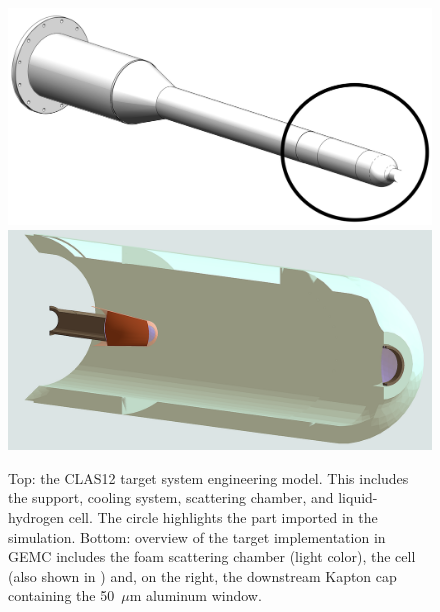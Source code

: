 \begin{figure}[ht]
	\centering
	\includegraphics[width=0.99\columnwidth,keepaspectratio]{img/targetOverview2.png}
	\includegraphics[width=0.99\columnwidth,keepaspectratio]{img/targetOverview1.png}
	\caption{Top: the CLAS12 target system engineering model. This includes the support, cooling system, scattering
          chamber, and liquid-hydrogen cell. The circle highlights the part imported in the simulation. Bottom: overview of
          the target implementation in GEMC includes the foam scattering chamber (light color), the cell (also shown in
          ) and, on the right, the downstream Kapton cap containing the 50~$\mu$m aluminum window.}
	\label{fig:targetOverview}
\end{figure}





